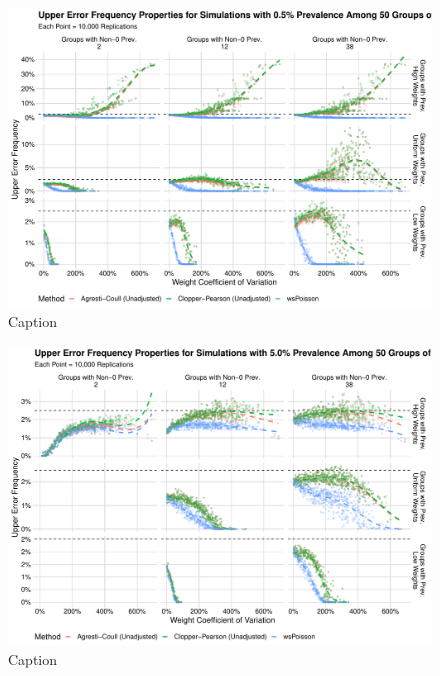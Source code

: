 \documentclass[AMA,STIX1COL]{WileyNJD-v2}
\begin{document}
\begin{figure}
    \centering
    \includegraphics[width=\textwidth]{figures/perfect_upper_error_frequency_50_0_005_reduced.pdf}
    \caption{Caption}
    \label{fig:perfect_upper_error_frequency_50_0_005_reduced}
\end{figure}


\begin{figure}
    \centering
    \includegraphics[width=\textwidth]{figures/perfect_upper_error_frequency_50_0_05_reduced.pdf}
    \caption{Caption}
    \label{fig:perfect_upper_error_frequency_50_0_05_reduced}
\end{figure}
\end{document}
